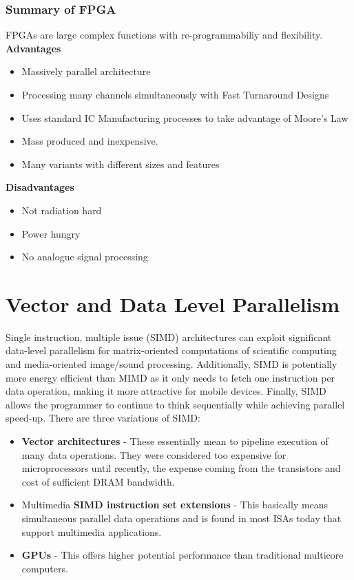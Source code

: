\documentclass[11pt]{article}
\begin{document}
\subsubsection{Summary of FPGA}
FPGAs are large complex functions with re-programmabiliy and flexibility. 
\n
\textbf{Advantages}
\begin{itemize}
\item Massively parallel architecture
\item Processing many channels simultaneously with Fast Turnaround Designs
\item Uses standard IC Manufacturing processes to take advantage of Moore's Law
\item Mass produced and inexpensive.
\item Many variants with different sizes and features
\end{itemize}
\textbf{Disadvantages}
\begin{itemize}
\item Not radiation hard
\item Power hungry
\item No analogue signal processing
\end{itemize}
\section{Vector and Data Level Parallelism}
Single instruction, multiple issue (SIMD) architectures can exploit significant data-level parallelism for matrix-oriented computations of scientific computing and media-oriented image/sound processing. Additionally, SIMD is potentially more energy efficient than MIMD as it only needs to fetch one instruction per data operation, making it more attractive for mobile devices. Finally, SIMD allows the programmer to continue to think sequentially while achieving parallel speed-up. 
\n
There are three variations of SIMD:
\begin{itemize}
\item \textbf{Vector architectures} - These essentially mean to pipeline execution of many data operations. They were considered too expensive for microprocessors until recently, the expense coming from the transistors and cost of sufficient DRAM bandwidth. 
\item Multimedia \textbf{SIMD instruction set extensions} - This basically means simultaneous parallel data operations and is found in most ISAs today that support multimedia applications. 
\item \textbf{GPUs} - This offers higher potential performance than traditional multicore computers. 
\end{itemize}
\end{document}
